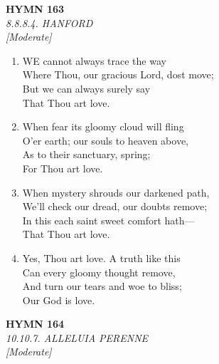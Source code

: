 \newpage
\begin{center}
    {\Large \textbf{HYMN 163}}
    \\
    \textit{8.8.8.4. HANFORD}
    \\
    \textit{\small [Moderate]}
\end{center}
\vspace{1em}

\begin{enumerate}
    \item WE cannot always trace the way \\
        Where Thou, our gracious Lord, dost move; \\
        But we can always surely say \\
        That Thou art love.

    \item When fear its gloomy cloud will fling \\
        O'er earth; our souls to heaven above, \\
        As to their sanctuary, spring; \\
        For Thou art love.

    \item When mystery shrouds our darkened path, \\
        We'll check our dread, our doubts remove; \\
        In this each saint sweet comfort hath--- \\
        That Thou art love.

    \item Yes, Thou art love. A truth like this \\
        Can every gloomy thought remove, \\
        And turn our tears and woe to bliss; \\
        Our God is love.

\end{enumerate}

\newpage
\begin{center}
    {\Large \textbf{HYMN 164}}
    \\
    \textit{10.10.7. ALLELUIA PERENNE}
    \\
    \textit{\small [Moderate]}
\end{center}
\vspace{1em}

